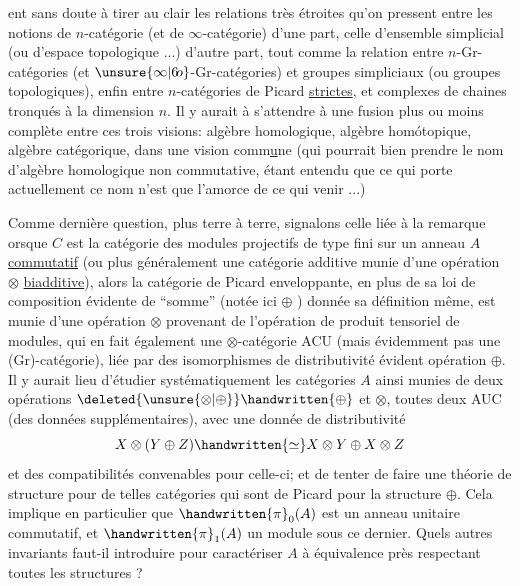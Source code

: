 
ent sans doute à tirer au clair les relations très étroites qu'on pressent entre les notions de $n$-catégorie (et de $\infty$-catégorie) d'une part, celle d'ensemble simplicial (ou d'espace topologique ...) d'autre part, tout comme la relation entre $n$-Gr-catégories (et $\unsure{\infty|6\!o}$-Gr-catégories) et groupes simpliciaux (ou groupes topologiques), enfin entre   $n$-catégories de Picard \uline{strictes}, et  complexes de chaines tronqués à la dimension $n$. Il y aurait à s'attendre à une fusion plus ou moins complète entre ces trois visions: algèbre homologique, algèbre homótopique, algèbre catégorique, dans une vision comm\uline{u}ne (qui pourrait bien prendre le nom d'algèbre homologique non commutative, étant entendu que ce qui porte actuellement ce nom n'est que l'amorce de ce qui   venir ...)

Comme dernière question, plus terre à terre, signalons celle liée à la remarque   orsque  $C$ est la catégorie des modules projectifs de type fini sur un anneau $A$ \uline{commutatif} (ou plus généralement une catégorie additive munie d'une opération $\otimes$   \uline{biadditive}), alors la catégorie de Picard enveloppante, en plus de sa loi de composition évidente de ``somme'' (notée ici $\oplus$ ) donnée   sa définition même, est munie d'une opération $\otimes$ provenant de l'opération de produit tensoriel  de modules, qui en fait également une $\otimes$-catégorie ACU (mais évidemment pas une (Gr)-catégorie), liée par des isomorphismes de distributivité évident   opération $\oplus$. Il y aurait lieu d'étudier systématiquement les catégories $A$ ainsi munies de deux opérations $\deleted{\unsure{\otimes|\oplus}}\handwritten{\oplus}$ et $\otimes$, toutes deux AUC (des données supplémentaires), avec une donnée de distributivité
\[
X\otimes(Y\oplus Z)\handwritten{\simeq}X\otimes Y\oplus X\otimes Z
\]
et des compatibilités convenables pour celle-ci; et de tenter de faire une théorie de structure pour de telles catégories qui sont de  Picard pour la structure $\oplus$. Cela implique en particulier que $\handwritten{\pi}_{0}(A)$ est un anneau unitaire commutatif, et $\handwritten{\pi}_{1}(A)$ un module sous ce dernier. Quels autres invariants faut-il introduire pour caractériser $A$ à équivalence près respectant toutes les structures ?

